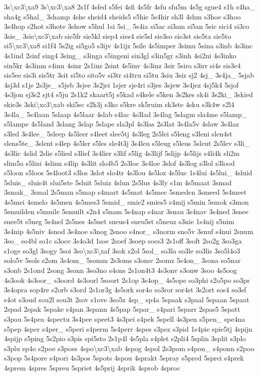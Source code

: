 {3s\textbackslash{}xc3\textbackslash{}xa9 3s\textbackslash{}xc3\textbackslash{}xa8 2s1f 4sfed s5fei 4sfi 4s5fr 4sfu sfu5m 4s5g sgue4 s1h s4ha\-\_\- sha4g s5hal\-\_\- 3shamp 4she sheid4 sheids5 s5hie 5s4hir sh3l 4shm s3hoe s3hoo 3s4hop s2hot s3hote 3show s5hul 1si 5si\-\_\- 5s4ia si5ac si3am si5an 5sic sici4 si3co 3sie\-\_\- 3sie\textbackslash{}xc3\textbackslash{}xab sie5fr sie5kl siep4 sies4 sie5sl sie3so sie3st sie5ta sie5to si5\textbackslash{}xc3\textbackslash{}xa8 si1f4 5s2ig si5go5 s3ijv 4s1ijz 5sile 4s5imper 3simu 5sina s3inb 4s3inc 4s1ind 2sinf sing4 3sing\-\_\- s3inga s5ingeni sin3gl s3in5gr s3inh 4si2ni 4s3inko sin5kr 4s3inm s4inn 4sinr 2s1ins 2sint 4s5inv 4s3inz 3sir 5siro s3irr si4s sis3e4 sis5ee sis3i sis5tr 3sit si5to sito5v si3tr si4tru si5tu 3siu 3siz sj2 4sj\-\_\- 3s4ja\-\_\- 5sjab 4sj3d s1je 2s3je\-\_\- s5jeb 3sjee 3s2jei 1sjer sje4ri s3jes 3sjew 3s4jez 4sj5k4 5sjof 4s3jon sj3s2 sjt4 s5ju 2s1k2 skaart5j s5kad s4kele s5ken 3s2kes sk4i 3s2ki\-\_\- 3skied skie3s 3ski\textbackslash{}xc3\textbackslash{}xab ski5sc s2k3j s3ko s5kre sk5ruim sk3ste 4sku s3k4w s2l4 3s4la\-\_\- 5s4laan 5slaap 4s5laar 4slab s4lac 4s3lad 3s4lag 5slagm sla4me s5lamp\-\_\- s5lampe 4s5land 3slang 3slap 5slape sla3pl 4s3las 2s3lat 3s4la5v 4slaw 3s4laz s3led 3s4lee\-\_\- 5sleep 4s5leer s4leet slee5tj 4s3leg 2s5lei s5leng s3leni slen4st slens5te\-\_\- 3slent s4lep 4s5ler s5les sle4t3j 3s4leu s5leug s5leus 5sleut 2s5lev s3li\-\_\- 4s3lic 4slid 2slie s5lied s3lief 3s4lier s3lif s5lig 4s3lijf 5slijp 4s5lijs s4li4k sli2m slim5a s5lini 4slinn s4lip 4s3lit slo4b5 2s3loc 3s4loe 3slof 4s3log s3lol s3lood s5loon s5loos 5s4loot3 s3los 3slot slo4tr 4s3lou 4s5loz 4s5luc 1s4lui 4s5lui\-\_\- 4sluid 5sluis\-\_\- sluis4t slui5ste 5sluit 5sluiz 4slun 2s5lus 4s3ly s1m 4s5maat 3smad 3smak\-\_\- 3smal 2s5man s5map s4mart 4s5mat 4s5mec 5smeden 3smeed 5s4meet 4s5mei 4smelo 4s5men 4s5mes3 5smid\-\_\- smie2 smies5 s4mij s5min 5smok s3mon 5smuilden s5muile 5smuilt s2n4 s5nam 5s4nap s4nar 3snau 3s4nav 3s4ned 3snee snee5t s5neg 5s4nel 2s5nes 4s5net sneus4 sneu5st s5neuz s3nie 1s4nij s5nim 3s4nip 4s5niv 4snod 3s4noe s3nog 2snoo s4nor\-\_\- s3norm sno5v 3snuf s4nui 2snum 3so\-\_\- so4bl so1c s3oce 3s4o3d 1soe 2soef 3soep soes3 2s1off 3soft 2so2g 3so3ga s1oge so3gl 3sogy 5soi 3so\textbackslash{}xc3\textbackslash{}xaf 3sok s2ol 5sol\-\_\- so3la so3le so3lis 3so5l4o3 solo5v 5sols s2om 3s4om\-\_\- 5somm 2s3oms s3omv 2somz 5s4on\-\_\- 3sona so5nar s3onb 2s1ond 2song 3sonn 3so3no s4ons 2s1on4t3 4s3onv s3onw 3soo 4s5oog 4s3ook 4s3oor\-\_\- s3oord 4s3oorl 5soort 2s1op 3s4op\-\_\- 4s5ope so3phi s2o5po so3pr 3s4opra sop4re s2orb s3ord 2s1or3g 4s5ork sor4o so3ror sor4st 3s2ort sos4 so3sf s4ot s3oud sou2l sou3t 2sov s1ove 3so5z 4sp\-\_\- sp4a 5spaak s3paal 5spaan 5spaat 2spad 2spak 5spake s4pan 3spann 4s5pap 5spar\-\_\- s4pari 5sparr 2spas5 5spatt s3pau 5s4pea 4spectu 3s4pee speet3 4s3pei s4pek 5spell 4s3pen s5pen\-\_\- spe4na s5pep 4sper s4per\-\_\- s5peri s4perm 5s4perr 4spes s3pez s3pid 1s4pie spie5tj 4spijn 4spijp s5ping 5s2pio s3pis spi5sto 2s1p4l 4s5pla s4plet s2pli4 5splin 3split s3plo s3plu sp4o s2poe s3poes 4spo\textbackslash{}xc3\textbackslash{}xab 4spog 4spol 2s3pom s4pon\-\_\- s4ponn s2poo s3pop 5s4pore s4pori 4s3pos 5spots 4spou 4sprakt 5spray s5pred 5sprei s4prek 4sprem 4spres 5spreu 5spriet 4s5prij 4sprik 4sprob 4sproc }

